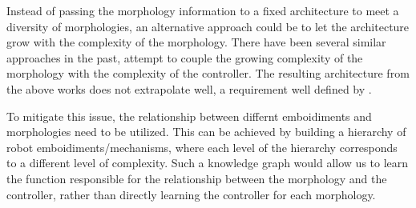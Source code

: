Instead of passing the morphology information to a fixed architecture to meet a diversity of morphologies, an alternative approach could be to let the architecture grow with the complexity of the morphology.
There have been several similar approaches in the past, \cite{deshpandeDeepCPGPoliciesRobot2023} \cite{whitmanLearningModularRobot2023} attempt to couple the growing complexity of the morphology with the complexity of the controller. The resulting architecture from the above works does not extrapolate well, a requirement well defined by \cite{parakhAnyBodyBenchmarkSuite2025}.

To mitigate this issue, the relationship between differnt emboidiments and morphologies need to be utilized.
This can be achieved by building a hierarchy of robot emboidiments/mechanisms, where each level of the hierarchy corresponds to a different level of complexity. 
Such a knowledge graph would allow us to learn the function responsible for the relationship between the morphology and the controller, rather than directly learning the controller for each morphology.